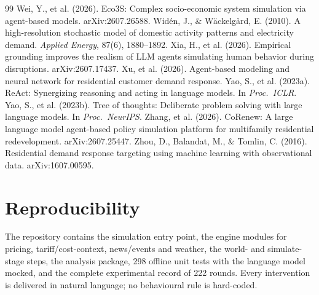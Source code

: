 \documentclass[11pt]{article}
\begin{document}
\begin{thebibliography}{99}
 Wei, Y., et al. (2026). Eco3S: Complex socio-economic system simulation via agent-based models. arXiv:2607.26588.
 Wid\'en, J., \& W\"ackelg\r{a}rd, E. (2010). A high-resolution stochastic model of domestic activity patterns and electricity demand. \emph{Applied Energy}, 87(6), 1880--1892.
 Xia, H., et al. (2026). Empirical grounding improves the realism of LLM agents simulating human behavior during disruptions. arXiv:2607.17437.
 Xu, et al. (2026). Agent-based modeling and neural network for residential customer demand response.
 Yao, S., et al. (2023a). ReAct: Synergizing reasoning and acting in language models. In \emph{Proc.\ ICLR}.
 Yao, S., et al. (2023b). Tree of thoughts: Deliberate problem solving with large language models. In \emph{Proc.\ NeurIPS}.
 Zhang, et al. (2026). CoRenew: A large language model agent-based policy simulation platform for multifamily residential redevelopment. arXiv:2607.25447.
 Zhou, D., Balandat, M., \& Tomlin, C. (2016). Residential demand response targeting using machine learning with observational data. arXiv:1607.00595.
\end{thebibliography}

\appendix
\section{Reproducibility}
The repository contains the simulation entry point, the engine modules for pricing, tariff/cost-context,
news/events and weather, the world- and simulate-stage steps, the analysis package, 298 offline unit tests
with the language model mocked, and the complete experimental record of 222 rounds. Every intervention is
delivered in natural language; no behavioural rule is hard-coded.
\end{document}
